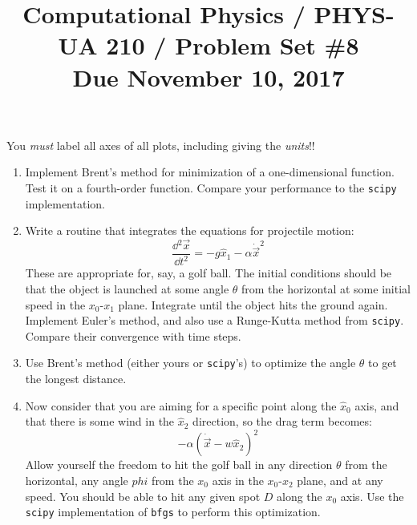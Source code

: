 \documentclass[11pt, preprint]{aastex}
\begin{document}
\title{\bf Computational Physics / PHYS-UA 210 / Problem Set \#8
\\ Due November 10, 2017 }

You {\it must} label all axes of all plots, including giving the {\it
  units}!!

\begin{enumerate} 
\item Implement Brent's method for minimization of a one-dimensional
  function. Test it on a fourth-order function. Compare your
  performance to the {\tt scipy} implementation.
\item Write a routine that integrates the equations for projectile
  motion:
  \begin{equation}
    \frac{\dd{^2\vec{x}}}{\dd{t}^2} = - g {\hat x}_1 - \alpha
    \dot{\vec{x}}^2
  \end{equation}
  These are appropriate for, say, a golf ball. 
  The initial conditions should be that the object is launched at some
  angle $\theta$ from the horizontal at some initial speed in the
  $x_0$-$x_1$ plane. Integrate until the object hits the ground
  again. Implement Euler's method, and also use a Runge-Kutta method
  from {\tt scipy}. Compare their convergence with time steps.
\item Use Brent's method (either yours or {\tt scipy}'s) to optimize
  the angle $\theta$ to get the longest distance.
\item Now consider that you are aiming for a specific point along the
  ${\hat x}_0$ axis, and that there is some wind in the ${\hat x}_2$
  direction, so the drag term becomes: 
  \begin{equation}
    - \alpha (\dot{\vec{x}} - w {\hat x_2})^2 
  \end{equation}
  Allow yourself the freedom to hit the golf ball in any direction
  $\theta$ from the horizontal, any angle $phi$ from the $x_0$ axis in
  the $x_0$-$x_2$ plane, and at any speed. You should be able to hit
  any given spot $D$ along the $x_0$ axis. Use the {\tt scipy}
  implementation of {\tt bfgs} to perform this optimization.
\end{enumerate} 
\end{document}
